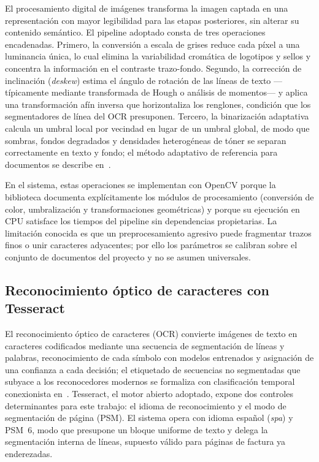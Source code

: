 El procesamiento digital de imágenes transforma la imagen captada en una representación con mayor legibilidad para las etapas posteriores, sin alterar su contenido semántico\cite{bradski_opencv_2008, opencv_docs}. El pipeline adoptado consta de tres operaciones encadenadas. Primero, la conversión a escala de grises reduce cada píxel a una luminancia única, lo cual elimina la variabilidad cromática de logotipos y sellos y concentra la información en el contraste trazo-fondo\cite{bradski_opencv_2008}. Segundo, la corrección de inclinación (\textit{deskew}) estima el ángulo de rotación de las líneas de texto —típicamente mediante transformada de Hough o análisis de momentos— y aplica una transformación afín inversa que horizontaliza los renglones, condición que los segmentadores de línea del OCR presuponen\cite{bradski_opencv_2008, opencv_docs}. Tercero, la binarizaci\'on adaptativa calcula un umbral local por vecindad en lugar de un umbral global, de modo que sombras, fondos degradados y densidades heterog\'eneas de t\'oner se separan correctamente en texto y fondo\cite{bradski_opencv_2008, opencv_docs}; el m\'etodo adaptativo de referencia para documentos se describe en~\cite{sauvola_binarization_2000}.

En el sistema, estas operaciones se implementan con OpenCV porque la biblioteca documenta explícitamente los módulos de procesamiento (conversión de color, umbralización y transformaciones geométricas) y porque su ejecución en CPU satisface los tiempos del pipeline sin dependencias propietarias\cite{opencv_docs}. La limitación conocida es que un preprocesamiento agresivo puede fragmentar trazos finos o unir caracteres adyacentes; por ello los parámetros se calibran sobre el conjunto de documentos del proyecto y no se asumen universales\cite{bradski_opencv_2008, opencv_docs}.

\subsection{Reconocimiento óptico de caracteres con Tesseract} \label{sec:mt_ocr}

El reconocimiento \'optico de caracteres (OCR) convierte im\'agenes de texto en caracteres codificados mediante una secuencia de segmentaci\'on de l\'ineas y palabras, reconocimiento de cada s\'imbolo con modelos entrenados y asignaci\'on de una confianza a cada decisi\'on\cite{smith_tesseract_2007}; el etiquetado de secuencias no segmentadas que subyace a los reconocedores modernos se formaliza con clasificaci\'on temporal conexionista en~\cite{graves_ctc_2006}. Tesseract, el motor abierto adoptado, expone dos controles determinantes para este trabajo: el idioma de reconocimiento y el modo de segmentación de página (PSM). El sistema opera con idioma español (\textit{spa}) y PSM~6, modo que presupone un bloque uniforme de texto y delega la segmentación interna de líneas, supuesto válido para páginas de factura ya enderezadas\cite{tesseract_ocr, smith_tesseract_2007}.

